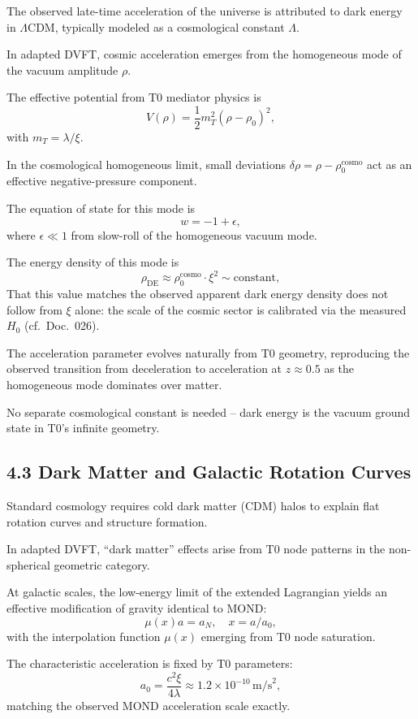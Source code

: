 	The observed late-time acceleration of the universe is attributed to dark energy in $\Lambda$CDM, typically modeled as a cosmological constant $\Lambda$.
	
	In adapted DVFT, cosmic acceleration emerges from the homogeneous mode of the vacuum amplitude $\rho$.
	
	The effective potential from T0 mediator physics is
	\[
	V(\rho) = \frac{1}{2} m_T^2 (\rho - \rho_0)^2,
	\]
	with $m_T = \lambda / \xi$.
	
	In the cosmological homogeneous limit, small deviations $\delta \rho = \rho - \rho_0^{\text{cosmo}}$ act as an effective negative-pressure component.
	
	The equation of state for this mode is
	\[
	w = -1 + \epsilon,
	\]
	where $\epsilon \ll 1$ from slow-roll of the homogeneous vacuum mode.
	
	The energy density of this mode is
	\[
	\rho_{\text{DE}} \approx \rho_0^{\text{cosmo}} \cdot \xi^2 \sim \text{constant},
	\]
	That this value matches the observed apparent dark energy density does not follow from $\xi$ alone: the scale of the cosmic sector is calibrated via the measured $H_0$ (cf.\ Doc.~026).
	
	The acceleration parameter evolves naturally from T0 geometry, reproducing the observed transition from deceleration to acceleration at $z \approx 0.5$ as the homogeneous mode dominates over matter.
	
	No separate cosmological constant is needed – dark energy is the vacuum ground state in T0's infinite geometry.
	
	\subsection{4.3 Dark Matter and Galactic Rotation Curves}
	
	Standard cosmology requires cold dark matter (CDM) halos to explain flat rotation curves and structure formation.
	
	In adapted DVFT, ``dark matter'' effects arise from T0 node patterns in the non-spherical geometric category.
	
	At galactic scales, the low-energy limit of the extended Lagrangian yields an effective modification of gravity identical to MOND:
	\[
	\mu(x) a = a_N, \quad x = a / a_0,
	\]
	with the interpolation function $\mu(x)$ emerging from T0 node saturation.
	
	The characteristic acceleration is fixed by T0 parameters:
	\[
	a_0 = \frac{c^2 \xi}{4 \lambda} \approx 1.2 \times 10^{-10} \, \text{m/s}^2,
	\]
	matching the observed MOND acceleration scale exactly.
	
